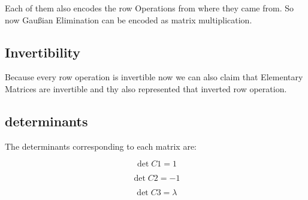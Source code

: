 Each of them also encodes the row Operations from where they came from.
So now Gaußian Elimination can be encoded as matrix multiplication.

\subsection{Invertibility}

Because every row operation is invertible now we can also claim that
Elementary Matrices are invertible and thy also represented that inverted row operation.


\subsection{determinants}

The determinants corresponding to each matrix are:

\[\det C1 = 1\]

\[\det C2 = -1\]

\[\det C3 = \lambda\]

\newpage